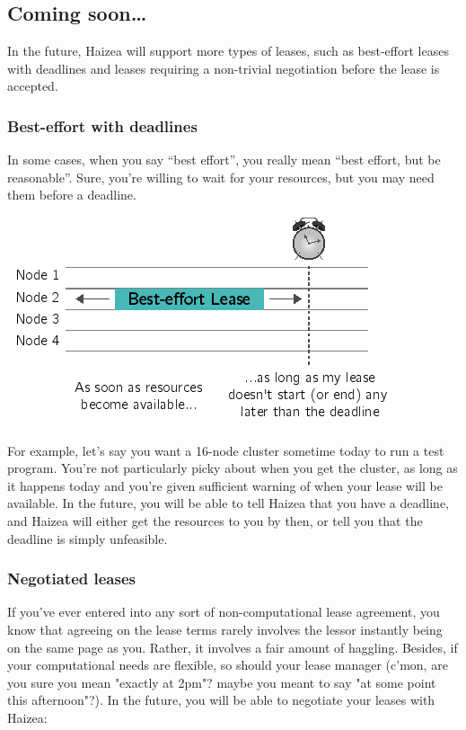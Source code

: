 \subsection{Coming soon\ldots}

In the future, Haizea will support more types of leases, such as best-effort leases with deadlines and leases requiring a non-trivial negotiation before the lease is accepted.

\subsubsection{Best-effort with deadlines}

In some cases, when you say ``best effort'', you really mean ``best effort, but be reasonable''. Sure, you're willing to wait for your resources, but you may need them before a deadline.

\begin{center}
\includegraphics{images/lease_deadline.png}
\end{center}


For example, let's say you want a 16-node cluster sometime today to run a test program. You're not particularly picky about when you get the cluster, as long as it happens today and you're given sufficient warning of when your lease will be available. In the future, you will be able to tell Haizea that you have a deadline, and Haizea will either get the resources to you by then, or tell you that the deadline is simply unfeasible.

\subsubsection{Negotiated leases}

If you've ever entered into any sort of non-computational lease agreement, you know that agreeing on the lease terms rarely involves the lessor instantly being on the same page as you. Rather, it involves a fair amount of haggling. Besides, if your computational needs are flexible, so should your lease manager (c'mon, are you sure you mean "exactly at 2pm"? maybe you meant to say "at some point this afternoon"?). In the future, you will be able to negotiate your leases with Haizea:

